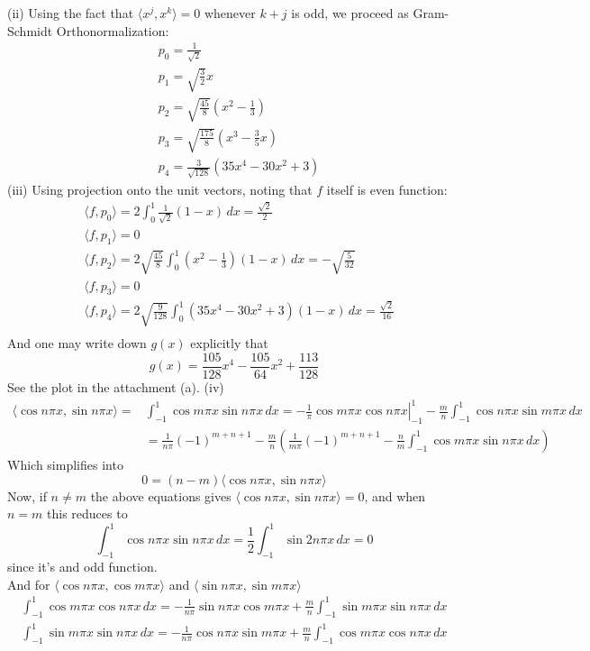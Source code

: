 \documentclass[12pt]{article}
\def\dotp#1#2{\langle#1,#2\rangle}
\begin{document}
(ii) Using the fact that $\dotp{x^j}{x^k}=0$ whenever $k+j$ is odd, we proceed as Gram-Schmidt Orthonormalization:
\begin{align*}
&p_0=\frac{1}{\sqrt{2}}\\
&p_1=\sqrt{\frac{3}{2}}x\\
&p_2=\sqrt{\frac{45}{8}}(x^2-\frac{1}{3})\\
&p_3=\sqrt{\frac{175}{8}}(x^3-\frac{3}{5}x)\\
&p_4=\frac{3}{\sqrt{128}}(35x^4-30x^2+3)
\end{align*}
(iii) Using projection onto the unit vectors, noting that $f$ itself is even function:
\begin{align*}
&\dotp{f}{p_0}=2\int_{0}^{1}\frac{1}{\sqrt2}(1-x)\,dx=\frac{\sqrt{2}}{2}\\
&\dotp{f}{p_1}=0\\
&\dotp{f}{p_2}=2\sqrt{\frac{45}{8}}\int_{0}^{1}(x^2-\frac{1}{3})(1-x)\,dx=-\sqrt{\frac{5}{32}}\\
&\dotp{f}{p_3}=0\\
&\dotp{f}{p_4}=2\sqrt{\frac{9}{128}}\int_{0}^{1}(35x^4-30x^2+3)(1-x)\,dx=\frac{\sqrt2}{16}\\
\end{align*}
And one may write down $g(x)$ explicitly that 
\[
g(x)=\frac{105}{128}x^{4}-\frac{105}{64}x^{2}+\frac{113}{128}
\]
See the plot in the attachment (a).
(iv)
\begin{align*}
\dotp{\cos{n\pi x}}{\sin{n\pi x}}=
&\int_{-1}^{1}\cos{m\pi x}\sin{n\pi x}\, dx=\left.-\frac{1}{\pi}\cos m\pi x \cos n\pi x\right |_{-1}^1-\frac{m}{n}\int_{-1}^{1}\cos{n\pi x}\sin{m\pi x}\, dx\\
&=\frac{1}{n\pi}{(-1)}^{m+n+1}-\frac{m}{n}\left(\frac{1}{m\pi}{(-1)}^{m+n+1}-\frac{n}{m}\int_{-1}^{1}\cos{m\pi x}\sin{n\pi x}\, dx\right)
\end{align*}
Which simplifies into
\[
0=(n-m)\dotp{\cos{n\pi x}}{\sin{n\pi x}}
\]
Now, if $n\neq m$ the above equations gives $\dotp{\cos{n\pi x}}{\sin{n\pi x}}=0$, and when $n=m$ this reduces to
\[
\int_{-1}^{1}\cos{n\pi x}\sin{n\pi x}\, dx=\frac{1}{2}\int_{-1}^{1}\sin{2n\pi x}\, dx=0
\]
since it's and odd function.\\
And for $\dotp{\cos{n\pi x}}{\cos{m\pi x}}$ and $\dotp{\sin{n\pi x}}{\sin{m\pi x}}$
\begin{align*}
\int_{-1}^{1}\cos{m\pi x}\cos{n\pi x}\, dx=-\frac{1}{n\pi}\sin{n\pi x}\cos{m\pi x}+\frac{m}{n}\int_{-1}^{1}\sin{m\pi x}\sin{n\pi x}\, dx\\
\int_{-1}^{1}\sin{m\pi x}\sin{n\pi x}\, dx=-\frac{1}{n\pi}\cos{n\pi x}\sin{m\pi x}+\frac{m}{n}\int_{-1}^{1}\cos{m\pi x}\cos{n\pi x}\, dx
\end{align*}
\end{document}
